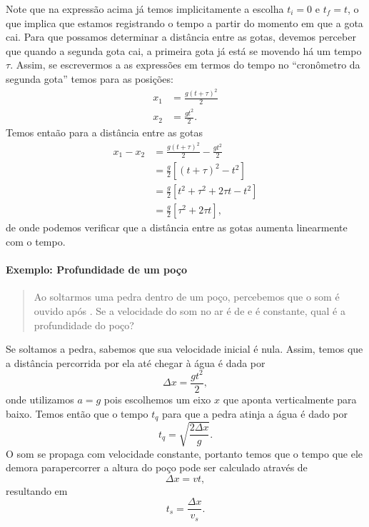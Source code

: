 Note que na expressão acima já temos implicitamente a escolha $t_i = 0$ e $t_f = t$, o que implica que estamos registrando o tempo a partir do momento em que a gota cai. Para que possamos determinar a distância entre as gotas, devemos perceber que quando a segunda gota cai, a primeira gota já está se movendo há um tempo $\tau$. Assim, se escrevermos a as expressões em termos do tempo no ``cronômetro da segunda gota'' temos para as posições:
\begin{align}
	x_1 &= \frac{g(t + \tau)^2}{2} \\
	x_2 &= \frac{gt^2}{2}.
\end{align}
%
Temos entaão para a distância entre as gotas
\begin{align}
	x_1 - x_2 &= \frac{g(t + \tau)^2}{2} - \frac{gt^2}{2}\\
			  &= \frac{g}{2} \left[(t + \tau)^2 - t^2\right] \\
			  &= \frac{g}{2} \left[t^2 + \tau^2 + 2\tau t - t^2\right] \\
			  &= \frac{g}{2} [\tau^2 + 2\tau t],
\end{align}
%
de onde podemos verificar que a distância entre as gotas aumenta linearmente com o tempo.

\paragraph{Exemplo: Profundidade de um poço}

\begin{quote}
Ao soltarmos uma pedra dentro de um poço, percebemos que o som é ouvido após . Se a velocidade do som no ar é de  e é constante, qual é a profundidade do poço?
\end{quote}

Se soltamos a pedra, sabemos que sua velocidade inicial é nula. Assim, temos que a distância percorrida por ela até chegar à água é dada por
\begin{equation}
	\Delta x = \frac{gt^2}{2},
\end{equation}
%
onde utilizamos $a = g$ pois escolhemos um eixo $x$ que aponta verticalmente para baixo. Temos então que o tempo $t_q$ para que a pedra atinja a água é dado por
\begin{equation}
	t_q = \sqrt{\frac{2 \Delta x}{g}}.
\end{equation}
%
O som se propaga com velocidade constante, portanto temos que o tempo que ele demora parapercorrer a altura do poço pode ser calculado através de 
\begin{equation}
	\Delta x = v t,
\end{equation}
%
resultando em
\begin{equation}
	t_s = \frac{\Delta x}{v_s}.
\end{equation}

